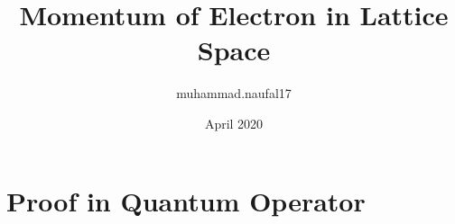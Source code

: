 \documentclass{article}
\title{Momentum of Electron in Lattice Space}
\author{muhammad.naufal17 }
\date{April 2020}
\begin{document}
\maketitle

\section{Proof in Quantum Operator}
\end{document}
